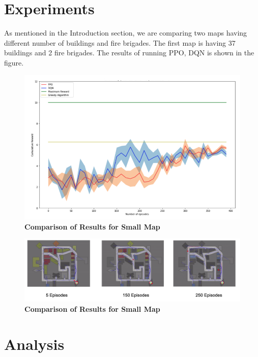 \documentclass[12pt]{report}
\begin{document}
\section{Experiments} \label{Experiments}

As mentioned in the Introduction section, we are comparing two maps having different number of buildings and fire brigades. The first map is having 37 buildings and 2 fire brigades. The results of running PPO, DQN is shown in the figure. 

\begin{figure}[!h]
    \centering
    \includegraphics[width=12cm]{29.png}
    \caption{\textbf{Comparison of Results for Small Map}}
    \label{fig:x}
\end{figure}

\begin{figure}[!h]
    \centering
    \includegraphics[width=16cm]{PPO.png}
    \caption{\textbf{Comparison of Results for Small Map}}
    \label{fig:x}
\end{figure}

\section{Analysis} \label{Analysis}
\end{document}
